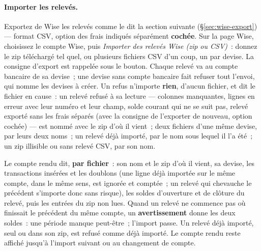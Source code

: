 \documentclass[a4paper,11pt,oneside]{article}
\begin{document}
\paragraph{Importer les relevés.} Exportez de Wise les relevés comme le dit la section suivante (\S\ref{sec:wise-export}) --- format CSV, option des frais indiqués séparément \textbf{cochée}. Sur la page Wise, choisissez le compte Wise, puis \emph{Importer des relevés Wise (zip ou CSV)}~: donnez le zip téléchargé tel quel, ou plusieurs fichiers CSV d'un coup, un par devise. La consigne d'export est rappelée sous le bouton. Chaque relevé va au compte bancaire de sa devise~; une devise sans compte bancaire fait refuser tout l'envoi, qui nomme les devises à créer. Un refus n'importe \textbf{rien}, d'aucun fichier, et dit le fichier en cause~: un relevé refusé à sa lecture --- colonnes manquantes, lignes en erreur avec leur numéro et leur champ, solde courant qui ne se suit pas, relevé exporté sans les frais séparés (avec la consigne de l'exporter de nouveau, option cochée) --- est nommé avec le zip d'où il vient~; deux fichiers d'une même devise, par leurs deux noms~; un relevé déjà importé, par le nom sous lequel il l'a été~; un zip illisible ou sans relevé CSV, par son nom.

Le compte rendu dit, \textbf{par fichier}~: son nom et le zip d'où il vient, sa devise, les transactions insérées et les doublons (une ligne déjà importée sur le même compte, dans le même sens, est ignorée et comptée~; un relevé qui chevauche le précédent s'importe donc sans risque), les soldes d'ouverture et de clôture du relevé, puis les entrées du zip non lues. Quand un relevé ne commence pas où finissait le précédent du même compte, un \textbf{avertissement} donne les deux soldes~: une période manque peut-être~; l'import passe. Un relevé déjà importé, seul ou dans son zip, est refusé comme déjà importé. Le compte rendu reste affiché jusqu'à l'import suivant ou au changement de compte.
\end{document}
